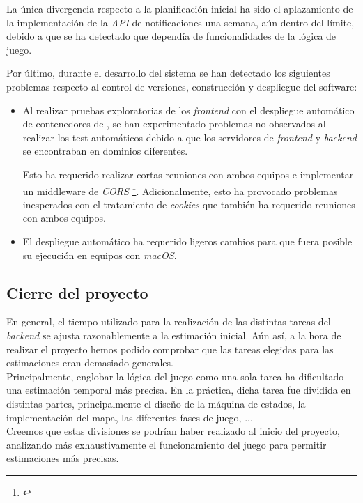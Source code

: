 \documentclass[11pt, a4paper, titlepage]{article}
\begin{document}
La única divergencia respecto a la planificación inicial ha sido el aplazamiento de la implementación de la \textit{API} de notificaciones una semana, aún dentro del límite, debido a que se ha detectado que dependía de funcionalidades de la lógica de juego.

Por último, durante el desarrollo del sistema se han detectado los siguientes problemas respecto al control de versiones, construcción y despliegue del software:
\begin{itemize}
    \item Al realizar pruebas exploratorias de los \textit{frontend} con el despliegue automático de contenedores de , se han experimentado problemas no observados al realizar los test automáticos debido a que los servidores de \textit{frontend} y \textit{backend} se encontraban en dominios diferentes.

    Esto ha requerido realizar cortas reuniones con ambos equipos e implementar un middleware de \textit{CORS} \footnote{\href{https://developer.mozilla.org/en-US/docs/Web/HTTP/CORS}{}}. Adicionalmente, esto ha provocado problemas inesperados con el tratamiento de \textit{cookies} que también ha requerido reuniones con ambos equipos.

    \item El despliegue automático ha requerido ligeros cambios para que fuera posible su ejecución en equipos con \textit{macOS}.
\end{itemize}

\subsection{Cierre del proyecto}
En general, el tiempo utilizado para la realización de las distintas tareas del \textit{backend} se ajusta razonablemente a la estimación inicial.
Aún así, a la hora de realizar el proyecto hemos podido comprobar que las tareas elegidas para las estimaciones eran demasiado generales.\\

Principalmente, englobar la lógica del juego como una sola tarea ha dificultado una estimación temporal más precisa. En la práctica, dicha tarea fue dividida en distintas partes, principalmente el diseño de la máquina de estados, la implementación del mapa, las diferentes fases de juego, ...\\
Creemos que estas divisiones se podrían haber realizado al inicio del proyecto, analizando más exhaustivamente el funcionamiento del juego para permitir estimaciones más precisas. \\
\end{document}
